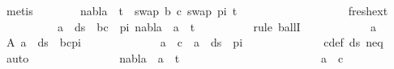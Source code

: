 \begin{isabellebody}
\ metis\isanewline
\ \ \ \ \ \ \isamarkupfalse%
\ {\isachardoublequoteopen}nabla\ {\isasymturnstile}\ t{\isacharprime}{\kern0pt}\ {\isasymapprox}\ swap\ {\isacharbrackleft}{\kern0pt}{\isacharparenleft}{\kern0pt}b{\isacharcomma}{\kern0pt}\ c{\isacharparenright}{\kern0pt}{\isacharbrackright}{\kern0pt}\ {\isacharparenleft}{\kern0pt}swap\ pi\ t{\isacharprime}{\kern0pt}{\isacharparenright}{\kern0pt}{\isachardoublequoteclose}\isanewline
\ \ \ \ \ \ \isamarkupfalse%
\ {\isacharminus}{\kern0pt}\isanewline
\ \ \ \ \ \ \ \ \ \isamarkupfalse%
\ fresh{\isacharunderscore}{\kern0pt}ext{\isacharcolon}{\kern0pt}\isanewline
\ \ \ \ \ \ \ \ \ \ {\isachardoublequoteopen}{\isasymforall}a\ {\isasymin}\ ds\ {\isacharbrackleft}{\kern0pt}{\isacharbrackright}{\kern0pt}\ {\isacharparenleft}{\kern0pt}{\isacharparenleft}{\kern0pt}b{\isacharcomma}{\kern0pt}c{\isacharparenright}{\kern0pt}\ {\isacharhash}{\kern0pt}\ pi{\isacharparenright}{\kern0pt}{\isachardot}{\kern0pt}\ nabla\ {\isasymturnstile}\ a\ {\isasymsharp}\ t{\isacharprime}{\kern0pt}{\isachardoublequoteclose}\isanewline
\ \ \ \ \ \ \ \ \isamarkupfalse%
\ {\isacharparenleft}{\kern0pt}rule\ ballI{\isacharparenright}{\kern0pt}\isanewline
\ \ \ \ \ \ \ \ \ \ \isamarkupfalse%
\ a\ \isamarkupfalse%
\ A{\isacharcolon}{\kern0pt}\ {\isachardoublequoteopen}a\ {\isasymin}\ ds\ {\isacharbrackleft}{\kern0pt}{\isacharbrackright}{\kern0pt}\ {\isacharparenleft}{\kern0pt}{\isacharparenleft}{\kern0pt}b{\isacharcomma}{\kern0pt}c{\isacharparenright}{\kern0pt}{\isacharhash}{\kern0pt}pi{\isacharparenright}{\kern0pt}{\isachardoublequoteclose}\isanewline
\ \ \ \ \ \ \ \ \ \ \isamarkupfalse%
\ \isamarkupfalse%
\ {\isachardoublequoteopen}a\ {\isacharequal}{\kern0pt}\ c\ {\isasymor}\ a\ {\isasymin}\ ds\ {\isacharbrackleft}{\kern0pt}{\isacharbrackright}{\kern0pt}\ pi{\isachardoublequoteclose}\isanewline
\ \ \ \ \ \ \ \ \ \ \ \ \isamarkupfalse%
\ c{\isacharunderscore}{\kern0pt}def\ ds{\isacharunderscore}{\kern0pt}{}\ neq\ \isamarkupfalse%
\ auto\ \ \isanewline
\ \ \ \ \ \ \ \ \ \ \isamarkupfalse%
\ \isamarkupfalse%
\ {\isachardoublequoteopen}nabla\ {\isasymturnstile}\ a\ {\isasymsharp}\ t{\isacharprime}{\kern0pt}{\isachardoublequoteclose}\isanewline
\ \ \ \ \ \ \ \ \ \ \isamarkupfalse%
\isanewline
\ \ \ \ \ \ \ \ \ \ \ \ \isamarkupfalse%
\ {\isachardoublequoteopen}a\ {\isacharequal}{\kern0pt}\ c{\isachardoublequoteclose}\isanewline

\end{isabellebody}
